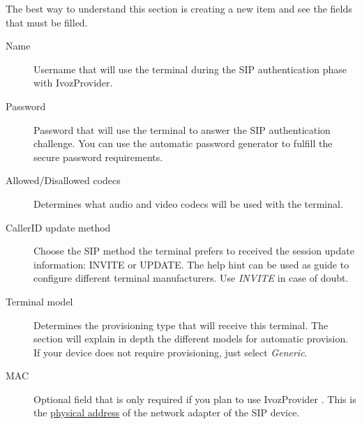 \documentclass[letterpaper,10pt,english]{sphinxmanual}
\begin{document}
The best way to understand this section is creating a new item and see the
fields that must be filled.
\begin{description}
\item[{Name}] \leavevmode{}\label{administration_portal/client/vpbx/terminals:term-name}
Username that will use the terminal during the SIP authentication phase
with IvozProvider.

\item[{Password}] \leavevmode{}\label{administration_portal/client/vpbx/terminals:term-password}
Password that will use the terminal to answer the SIP authentication
challenge. You can use the automatic password generator to fulfill the
secure password requirements.

\item[{Allowed/Disallowed codecs}] \leavevmode{}\label{administration_portal/client/vpbx/terminals:term-allowed-disallowed-codecs}
Determines what audio and video codecs will be used with the terminal.

\item[{CallerID update method}] \leavevmode{}\label{administration_portal/client/vpbx/terminals:term-callerid-update-method}
Choose the SIP method the terminal prefers to received the session
update information: INVITE or UPDATE. The help hint can be used as
guide to configure different terminal manufacturers. Use \emph{INVITE} in
case of doubt.

\item[{Terminal model}] \leavevmode{}\label{administration_portal/client/vpbx/terminals:term-terminal-model}
Determines the provisioning type that will receive this terminal.
The section {\hyperref[administration_portal/platform/terminal_manufacturers:provisioning]{}} will explain
in depth the different models for automatic provision. If your device
does not require provisioning, just select \emph{Generic}.

\item[{MAC}] \leavevmode{}\label{administration_portal/client/vpbx/terminals:term-mac}
Optional field that is only required if you plan to use IvozProvider
{\hyperref[administration_portal/platform/terminal_manufacturers:provisioning]{}}. This is the \href{https://wikipedia.org/wiki/MAC\_Address}{physical
address} of the network
adapter of the SIP device.


\end{description}
\end{document}
